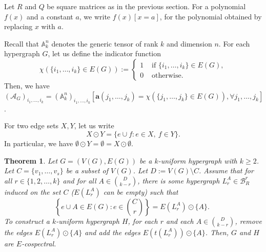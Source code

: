 \documentclass[12pt]{article}
\numberwithin{equation}{section}
\newtheorem{theorem}{Theorem}[section]
\theoremstyle{definition}
\newcommand{\ev}[1]{( #1 )}
\begin{document}
Let $R$ and $Q$ be square matrices as in the previous section. For a polynomial $f\ev{x}$ and a constant $a$, we write $f\ev{x} [ x = a ]$, for the polynomial obtained by replacing $x$ with $a$. 

Recall that $\mathbb{A}^n_k$ denotes the generic tensor of rank $k$ and dimension $n$. For each hypergraph $G$, let us define the indicator function 
$$\chi\ev{ \{ i_1, \ldots, i_k \} \in E\ev{G} } := \begin{cases} 1 & \text{ if } \{ i_1, \ldots, i_k \} \in E\ev{G}, \\ 0 &\text{ otherwise. } \end{cases}
$$
Then, we have $\ev{ \mathcal{A}_{G} }_{i_1,\ldots,i_k} = \ev{\mathbb{A}^n_k}_{i_1,\ldots,i_k} [ \mathbf{a}\ev{j_1,\ldots,j_k} = \chi\ev{ \{ j_1, \ldots, j_k \} \in E\ev{G} }, \forall j_1,\ldots,j_k ]$.

For two edge sets $X,Y$, let us write 
$$
X\odot Y = \{ e \cup f: e\in X, \ f \in Y \}.
$$
In particular, we have $\emptyset \odot Y = \emptyset = X\odot \emptyset$.  
\begin{theorem}
\label{thm:main_theorem}
Let $G = \ev{V\ev{G},E\ev{G}}$ be a $k$-uniform hypergraph with $k\geq 2$. Let $C=\{ v_1,\ldots,v_s \}$ be a subset of $V\ev{G}$. Let $D:= V\ev{G}\setminus C$. Assume that for all $r\in \{1,2,\ldots,k\}$ and for all $A \in \binom{D}{k-r} $, there is some hypergraph $L_r^A \in \mathcal{B}^{r}_{R}$ induced on the set $C$ ($E\ev{L_r^A}$ can be empty) such that 
\begin{equation}
\label{eqn:to_refer}
\text{$\left\{ e \cup A \in E\ev{G}: e\in \binom{C}{r} \right\} = E\ev{L_r^A} \odot \{A\}$. }
\end{equation}
To construct a $k$-uniform hypergraph $H$, for each $r$ and each $A \in \binom{D}{k-r}$, remove the edges $E\ev{L_r^A} \odot \{A\}$ and add the edges $ E\ev{t\ev{L_r^A}} \odot \{A\}$. Then, $G$ and $H$ are $E$-cospectral.
\end{theorem}
\end{document}

